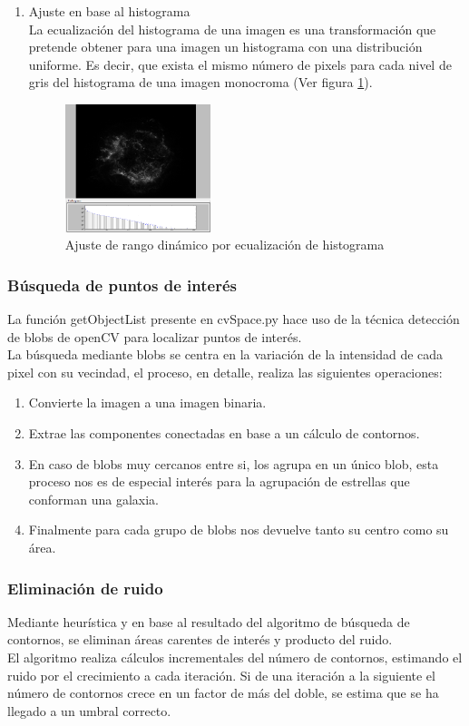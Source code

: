 \begin{enumerate}
		\item Ajuste en base al histograma\\
			La ecualización del histograma de una imagen es una transformación que pretende obtener para una imagen un histograma con una distribución uniforme. Es decir, que exista el mismo número de pixels para cada nivel de gris del histograma de una imagen monocroma (Ver figura \ref{fig:HDRHistograma}).
			\begin{figure}[!htb]
				\centering
				\includegraphics[width=0.4\textwidth]{images/HDREQ/chandraaHistEq.PNG}
				\caption{\label{fig:HDRHistograma}Ajuste de rango dinámico por ecualización de histograma}
			\end{figure}
	\end{enumerate}

	\subsubsection{Búsqueda de puntos de interés}
	La función getObjectList presente en cvSpace.py hace uso de la técnica detección de blobs de openCV para localizar puntos de interés.\\
	La búsqueda mediante blobs se centra en la variación de la intensidad de cada pixel con su vecindad, el proceso, en detalle, realiza las siguientes operaciones:
	\begin{enumerate}
		\item Convierte la imagen a una imagen binaria.
		\item Extrae las componentes conectadas en base a un cálculo de contornos.
		\item En caso de blobs muy cercanos entre si, los agrupa en un único blob, esta proceso nos es de especial interés para la agrupación de estrellas que conforman una galaxia.
		\item Finalmente para cada grupo de blobs nos devuelve tanto su centro como su área.
	\end{enumerate}

	\subsubsection{Eliminación de ruido}
	Mediante heurística y en base al resultado del algoritmo de búsqueda de contornos, se eliminan áreas carentes de interés y producto del ruido.
	\\El algoritmo realiza cálculos incrementales del número de contornos, estimando el ruido por el crecimiento a cada iteración. Si de una iteración a la siguiente el número de contornos crece en un factor de más del doble, se estima que se ha llegado a un umbral correcto. 
